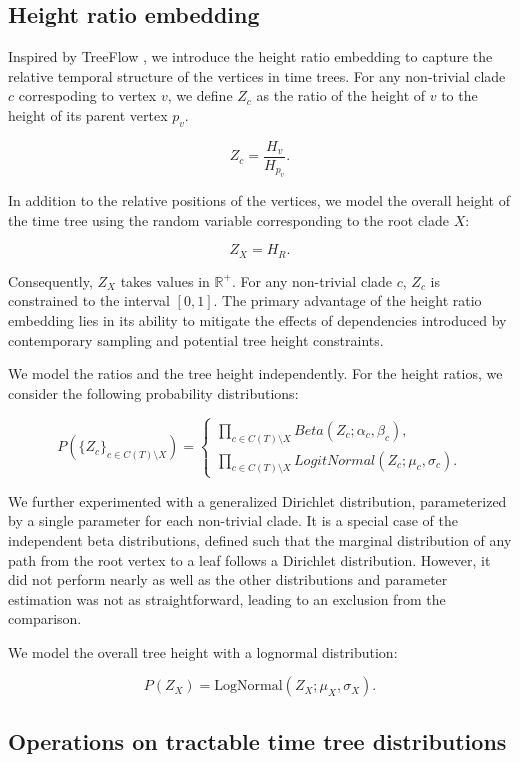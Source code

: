 \documentclass[10pt,letterpaper]{article}
\begin{document}
\subsection*{Height ratio embedding}

Inspired by TreeFlow \cite{treeflow}, we introduce the height ratio embedding to capture the relative temporal structure of the vertices in time trees. For any non-trivial clade $c$ correspoding to vertex $v$, we define $Z_c$ as the ratio of the height of $v$ to the height of its parent vertex $p_v$.

$$
Z_c = \frac{H_v}{H_{p_v}}.
$$

In addition to the relative positions of the vertices, we model the overall height of the time tree using the random variable corresponding to the root clade $X$:

$$
Z_X = H_R.
$$

Consequently, $Z_X$ takes values in $\mathbb{R}^+$. For any non-trivial clade $c$, $Z_c$ is constrained to the interval $[0, 1]$. The primary advantage of the height ratio embedding lies in its ability to mitigate the effects of dependencies introduced by contemporary sampling and potential tree height constraints.

We model the ratios and the tree height independently. For the height ratios, we consider the following probability distributions:

$$
P(\{Z_c\}_{c \in C(T) \setminus X}) = \begin{cases}
	\prod_{c \in C(T) \setminus X}{Beta(Z_c; \alpha_c, \beta_c)}, \\
	\prod_{c \in C(T) \setminus X}{LogitNormal(Z_c; \mu_c, \sigma_c)}.
\end{cases}
$$

We further experimented with a generalized Dirichlet distribution, parameterized by a single parameter for each non-trivial clade. It is a special case of the independent beta distributions, defined such that the marginal distribution of any path from the root vertex to a leaf follows a Dirichlet distribution. However, it did not perform nearly as well as the other distributions and parameter estimation was not as straightforward, leading to an exclusion from the comparison.

We model the overall tree height with a lognormal distribution:

$$
P(Z_X) = \text{LogNormal}(Z_X; \mu_X, \sigma_X).
$$

\subsection*{Operations on tractable time tree distributions}
\end{document}
